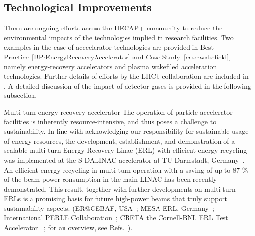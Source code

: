 \documentclass[../SustainableHEP.tex]{subfiles}
\begin{document}

\subsection{Technological Improvements}

There are ongoing efforts across the HECAP+ community to reduce the environmental impacts of the technologies implied in research facilities. Two examples in the case of acccelerator technologies are provided in Best Practice~\ref{BP:EnergyRecoveryAccelerator} and Case Study~\ref{case:wakefield}, namely energy-recovery accelerators and plasma wakefiled acceleration technologies. Further details of efforts by the LHCb collaboration are included in . A detailed discussion of the impact of detector gases is provided in the following subsection.

\begin{bestpractice}{Multi-turn energy-recovery accelerator}%
\noindent The operation of particle accelerator facilities is inherently resource-intensive, and thus poses a challenge to sustainability. In line with acknowledging our responsibility for sustainable usage of energy resources, the development, establishment, and demonstration of a scalable multi-turn Energy Recovery Linac (ERL) with efficient energy recycling was implemented at the S-DALINAC accelerator at TU Darmstadt, Germany~\cite{Arnold:2020snn}. An efficient energy-recycling in multi-turn operation with a saving of up to 87 \% of the beam power-consumption in the main LINAC has been recently demonstrated. This result, together with further developments on multi-turn ERLs is a promising basis for future high-power beams that truly support sustainability aspects. (ER@CEBAF, USA~\cite{Meot:2018yoo}; MESA ERL, Germany~\cite{MESA}; International PERLE Collaboration~\cite{PERLE, PERLECDR}; CBETA the Cornell-BNL ERL Test Accelerator ~\cite{CBETACDR}; for an overview, see Refs.~\cite{Klein:2022lgx, Hutton:2022kac}). 
\end{bestpractice}
\end{document}
